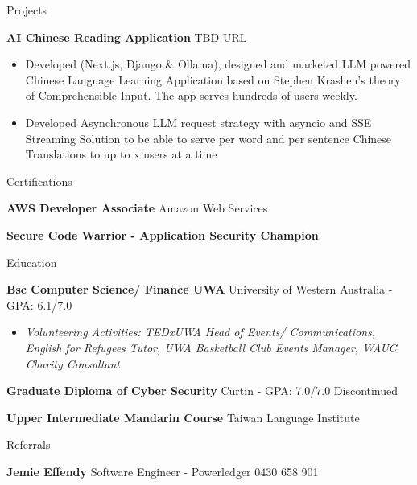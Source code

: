 \documentclass{resume} %
\begin{document}
	\begin{rSection}{Projects}
		\vspace{-0.8em}
		\item \textbf{AI Chinese Reading Application} {\hfill {} TBD URL}  
		\begin{itemize} 
			\item Developed (Next.js, Django \& Ollama), designed and marketed LLM powered Chinese Language Learning Application based on Stephen Krashen's theory of Comprehensible Input. The app serves hundreds of users weekly.
			\item Developed Asynchronous LLM request strategy with asyncio and SSE Streaming Solution to be able to serve per word and per sentence Chinese Translations to up to x users at a time
		\end{itemize}
	\end{rSection} 


	\begin{rSection}{Certifications}
		\vspace{-0.8em}
		\item \textbf{AWS Developer Associate} {Amazon Web Services} \hfill
		\item \textbf{Secure Code Warrior - Application Security Champion} \hfill 
	\end{rSection}
	
	\begin{rSection}{Education}
		\vspace{-0.8em}
		\item \textbf{Bsc Computer Science/ Finance UWA} {University of Western Australia} - GPA: 6.1/7.0 \hfill 
		\begin{itemize} 
			\scriptsize\item \textit{Volunteering Activities: TEDxUWA Head of Events/ Communications, English for Refugees Tutor, UWA Basketball Club Events Manager, WAUC Charity Consultant} \hfill
		\end{itemize}
		\item \textbf{Graduate Diploma of Cyber Security} {Curtin} - GPA: 7.0/7.0 \hfill Discontinued
		\item \textbf{Upper Intermediate Mandarin Course} {Taiwan Language Institute}\hfill 
	\end{rSection} 

	
	\begin{rSection}{Referrals} 
		\vspace{-0.8em}
		\item \textbf{Jemie Effendy} {Software Engineer - Powerledger} 
			\hfill 
			 0430 658 901
	\end{rSection}
\end{document}
